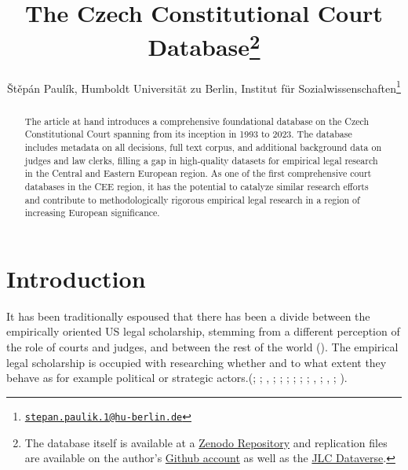 \documentclass[
  11pt,
]{article}
\title{The Czech Constitutional Court Database\thanks{The database itself is available at a \href{https://zenodo.org/records/11618008}{Zenodo Repository} and replication files are available on the author's \href{https://github.com/stepanpaulik/ccc_dataset}{Github account} as well as the \href{https://dataverse.harvard.edu/dataset.xhtml?persistentId=doi\%3A10.7910\%2FDVN\%2FZO0OOG}{JLC Dataverse}.}}
\author{Štěpán Paulík, Humboldt Universität zu Berlin, Institut für Sozialwissenschaften\footnote{\href{mailto:stepan.paulik.1@hu-berlin.de}{\nolinkurl{stepan.paulik.1@hu-berlin.de}}}}
\date{}
\begin{document}
\maketitle
\begin{abstract}
The article at hand introduces a comprehensive foundational database on the Czech Constitutional Court spanning from its inception in 1993 to 2023. The database includes metadata on all decisions, full text corpus, and additional background data on judges and law clerks, filling a gap in high-quality datasets for empirical legal research in the Central and Eastern European region. As one of the first comprehensive court databases in the CEE region, it has the potential to catalyze similar research efforts and contribute to methodologically rigorous empirical legal research in a region of increasing European significance.
\end{abstract}

\section{Introduction}\label{introduction}

It has been traditionally espoused that there has been a divide between the empirically oriented US legal scholarship, stemming from a different perception of the role of courts and judges, and between the rest of the world (). The empirical legal scholarship is occupied with researching whether and to what extent they behave as for example political or strategic actors.(; ; , ; ; ; ; ; ; , ; , ; ).
\end{document}
